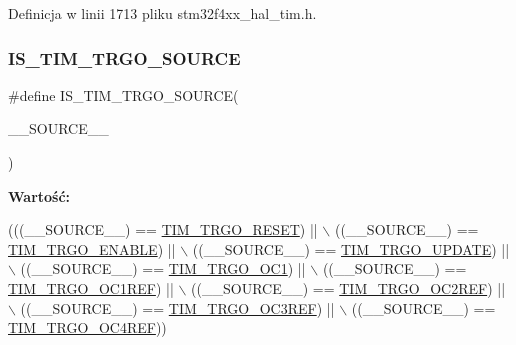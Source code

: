 Definicja w linii 1713 pliku stm32f4xx\+\_\+hal\+\_\+tim.\+h.

\mbox{\label{group___t_i_m___private___macros_ga9c59624b1c4a60f39385da551ab31e53}} 
\subsubsection{\texorpdfstring{I\+S\+\_\+\+T\+I\+M\+\_\+\+T\+R\+G\+O\+\_\+\+S\+O\+U\+R\+CE}{IS\_TIM\_TRGO\_SOURCE}}
{\footnotesize\ttfamily \#define I\+S\+\_\+\+T\+I\+M\+\_\+\+T\+R\+G\+O\+\_\+\+S\+O\+U\+R\+CE(\begin{DoxyParamCaption}\item[{}]{\+\_\+\+\_\+\+S\+O\+U\+R\+C\+E\+\_\+\+\_\+ }\end{DoxyParamCaption})}

{\bfseries Wartość\+:}
\begin{DoxyCode}
(((\_\_SOURCE\_\_) == \hyperlink{group___t_i_m___master___mode___selection_ga32a8e436f2c0818a657b0d3fcf4e872d}{TIM\_TRGO\_RESET})  || \(\backslash\)
                                        ((\_\_SOURCE\_\_) == \hyperlink{group___t_i_m___master___mode___selection_ga4ac300b0fd24d1e6532e5961680a39a9}{TIM\_TRGO\_ENABLE}) || \(\backslash\)
                                        ((\_\_SOURCE\_\_) == \hyperlink{group___t_i_m___master___mode___selection_ga27521aebd507e562fe7fba6dfc639a67}{TIM\_TRGO\_UPDATE}) || \(\backslash\)
                                        ((\_\_SOURCE\_\_) == \hyperlink{group___t_i_m___master___mode___selection_ga80aa9a9c41de509d99fc4cb492d6513f}{TIM\_TRGO\_OC1})    || \(\backslash\)
                                        ((\_\_SOURCE\_\_) == \hyperlink{group___t_i_m___master___mode___selection_gaed715aa7ec4ad0f7f5d82dde6d964178}{TIM\_TRGO\_OC1REF}) || \(\backslash\)
                                        ((\_\_SOURCE\_\_) == \hyperlink{group___t_i_m___master___mode___selection_gaaedc4b3f4c5c3c8b45a2cf1b73e33c0a}{TIM\_TRGO\_OC2REF}) || \(\backslash\)
                                        ((\_\_SOURCE\_\_) == \hyperlink{group___t_i_m___master___mode___selection_ga4bc4791f8b9560950d30078b96d08f55}{TIM\_TRGO\_OC3REF}) || \(\backslash\)
                                        ((\_\_SOURCE\_\_) == \hyperlink{group___t_i_m___master___mode___selection_ga7fe6228adec5d1b6f0a8ed8da111db4d}{TIM\_TRGO\_OC4REF}))
\end{DoxyCode}


